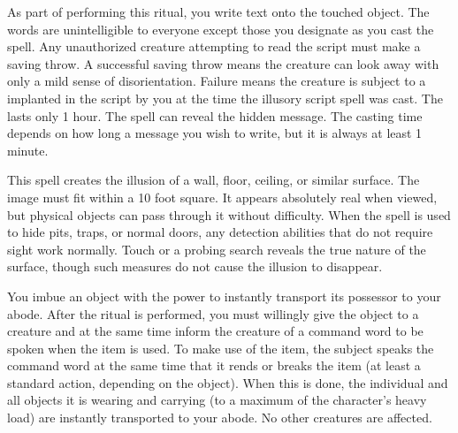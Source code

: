 \spelleffect As part of performing this ritual, you write text onto the touched object. The words are unintelligible to everyone except those you designate as you cast the spell. Any unauthorized creature attempting to read the script must make a saving throw. A successful saving throw means the creature can look away with only a mild sense of disorientation. Failure means the creature is subject to a  implanted in the script by you at the time the illusory script spell was cast. The  lasts only 1 hour.
\spellnotes The  spell can reveal the hidden message. The casting time depends on how long a message you wish to write, but it is always at least 1 minute.

\spelleffect This spell creates the illusion of a wall, floor, ceiling, or similar surface. The image must fit within a 10 foot square. It appears absolutely real when viewed, but physical objects can pass through it without difficulty. When the spell is used to hide pits, traps, or normal doors, any detection abilities that do not require sight work normally. Touch or a probing search reveals the true nature of the surface, though such measures do not cause the illusion to disappear.

\spelleffect You imbue an object with the power to instantly transport its possessor to your abode. After the ritual is performed, you must willingly give the object to a creature and at the same time inform the creature of a command word to be spoken when the item is used. To make use of the item, the subject speaks the command word at the same time that it rends or breaks the item (at least a standard action, depending on the object). When this is done, the individual and all objects it is wearing and carrying (to a maximum of the character's heavy load) are instantly transported to your abode. No other creatures are affected.


